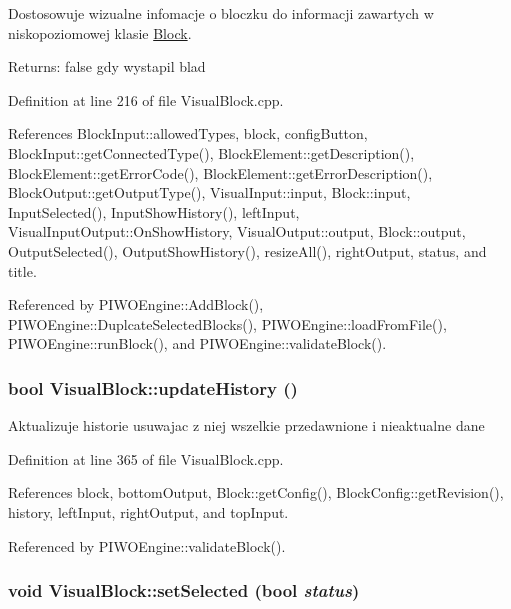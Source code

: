 Dostosowuje wizualne infomacje o bloczku do informacji zawartych w niskopoziomowej klasie \hyperlink{classBlock}{Block}. \begin{Desc}
\item[Returns:]false gdy wystapil blad \end{Desc}


Definition at line 216 of file VisualBlock.cpp.

References BlockInput::allowedTypes, block, configButton, BlockInput::getConnectedType(), BlockElement::getDescription(), BlockElement::getErrorCode(), BlockElement::getErrorDescription(), BlockOutput::getOutputType(), VisualInput::input, Block::input, InputSelected(), InputShowHistory(), leftInput, VisualInputOutput::OnShowHistory, VisualOutput::output, Block::output, OutputSelected(), OutputShowHistory(), resizeAll(), rightOutput, status, and title.

Referenced by PIWOEngine::AddBlock(), PIWOEngine::DuplcateSelectedBlocks(), PIWOEngine::loadFromFile(), PIWOEngine::runBlock(), and PIWOEngine::validateBlock().\hypertarget{classVisualBlock_22d016593be16c1d77e19c9a42d80afe}{
\subsubsection[updateHistory]{\setlength{\rightskip}{0pt plus 5cm}bool VisualBlock::updateHistory ()}}
\label{classVisualBlock_22d016593be16c1d77e19c9a42d80afe}


Aktualizuje historie usuwajac z niej wszelkie przedawnione i nieaktualne dane 

Definition at line 365 of file VisualBlock.cpp.

References block, bottomOutput, Block::getConfig(), BlockConfig::getRevision(), history, leftInput, rightOutput, and topInput.

Referenced by PIWOEngine::validateBlock().\hypertarget{classVisualBlock_8ca3f7d1dcc59e9383df931ed57a76c1}{
\subsubsection[setSelected]{\setlength{\rightskip}{0pt plus 5cm}void VisualBlock::setSelected (bool {\em status})}}
\label{classVisualBlock_8ca3f7d1dcc59e9383df931ed57a76c1}


